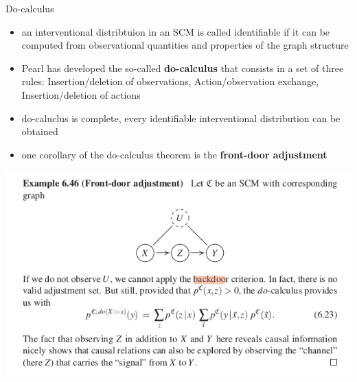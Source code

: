 \documentclass{beamer}
\begin{document}
\begin{frame}{Do-calculus}
	\begin{itemize}
		\item<1-> an interventional distribtuion in an SCM is called identifiable if it can be computed from observational quantities and properties of the graph structure 
		\item<2-> Pearl has developed the so-called \textbf{do-calculus} that consists in a set of three rules: Insertion/deletion of observations, Action/observation exchange, Insertion/deletion of actions
		\item<3-> do-caluclus is complete, every identifiable interventional distribution can be obtained 
		\item<4-> one corollary of the do-calculus theorem is the \textbf{front-door adjustment} 
	\end{itemize}

\end{frame}

\begin{frame}
	\includegraphics[scale=0.5]{images/front}
\end{frame}

\begin{frame}[allowframebreaks]

\end{frame}
\end{document}
